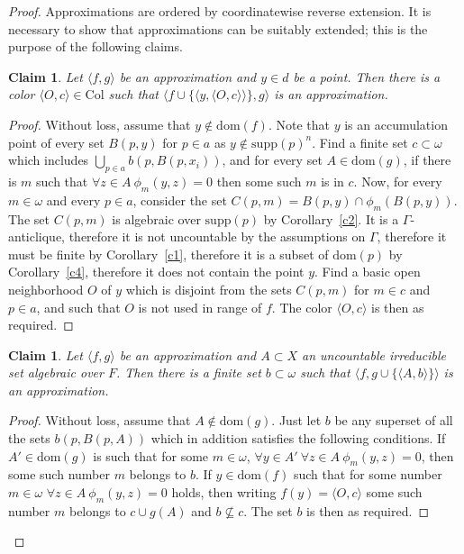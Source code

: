 \documentclass{article}
\newcommand{\gw}{\omega}
\newcommand{\supp}{\mathrm{supp}}
\newcommand{\dom}{\mathrm{dom}}
\newcommand{\colors}{\mathrm{Col}}
\newtheorem{claim}[theorem]{Claim}
\theoremstyle{definition}
\begin{document}
\begin{proof}
\noindent Approximations are ordered by coordinatewise reverse extension. It is necessary to show that approximations can be suitably extended; this is the purpose of the following claims.

\begin{claim}
Let $\langle f, g\rangle$ be an approximation and $y\in d$ be a point. Then there is a color $\langle O, c\rangle\in\colors$ such that $\langle f\cup \{\langle y, \langle O, c\rangle\rangle\}, g\rangle$ is an approximation.
\end{claim}

\begin{proof}
Without loss, assume that $y\notin\dom(f)$. Note that $y$ is an accumulation point of every set $B(p, y)$ for $p\in a$ as $y\notin\supp(p)^n$. Find a finite set $c\subset\gw$ which includes $\bigcup_{p\in a}b(p, B(p, x_i))$, and for every set $A\in\dom(g)$, if there is $m$ such that $\forall z\in A\ \phi_m(y,z)=0$ then some such $m$ is in $c$. Now, for every $m\in\gw$ and every $p\in a$, consider the set $C(p, m)=B(p, y)\cap \phi_m(B(p, y))$. The set $C(p, m)$ is algebraic over $\supp(p)$ by Corollary~\ref{c2}. It is a $\Gamma$-anticlique, therefore it is not uncountable by the assumptions on $\Gamma$, therefore it must be finite by Corollary~\ref{c1},  therefore it is a subset of $\dom(p)$ by Corollary~\ref{c4}, therefore it does not contain the point $y$. Find a basic open neighborhood $O$ of $y$ which is disjoint from the sets $C(p, m)$ for $m\in c$ and $p\in a$, and such that $O$ is not used in range of $f$. The color $\langle O, c\rangle$ is then as required.
\end{proof}

\begin{claim}
Let $\langle f, g\rangle$ be an approximation and $A\subset X$ an uncountable irreducible set algebraic over $F$. Then there is a finite set $b\subset\gw$ such that $\langle f, g\cup \{\langle A, b\rangle\}\rangle$ is an approximation.
\end{claim}

\begin{proof}
Without loss, assume that $A\notin\dom(g)$. Just let $b$ be any superset of all the sets $b(p, B(p, A))$ which in addition satisfies the following conditions. If $A'\in\dom(g)$ is such that for some $m\in\gw$, $\forall y\in A'\ \forall z\in A\ \phi_m(y, z)=0$, then some such number $m$ belongs to $b$.  If $y\in\dom(f)$ such that for some number $m\in\gw$ $\forall z\in A\ \phi_m(y, z)=0$ holds, then writing $f(y)=\langle O, c\rangle$ some such number $m$ belongs to $c\cup g(A)$ and $b\not\subseteq c$. The set $b$ is then as required.
\end{proof}


\end{proof}
\end{document}
